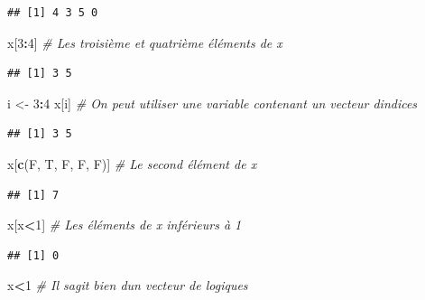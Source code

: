 \documentclass[
  11pt,
]{book}
\newenvironment{Shaded}{\begin{snugshade}}{\end{snugshade}}
\newcommand{\CommentTok}[1]{\textcolor[rgb]{0.56,0.35,0.01}{\textit{#1}}}
\newcommand{\DecValTok}[1]{\textcolor[rgb]{0.00,0.00,0.81}{#1}}
\newcommand{\KeywordTok}[1]{\textcolor[rgb]{0.13,0.29,0.53}{\textbf{#1}}}
\newcommand{\NormalTok}[1]{#1}
\newcommand{\OperatorTok}[1]{\textcolor[rgb]{0.81,0.36,0.00}{\textbf{#1}}}
\newcommand{\StringTok}[1]{\textcolor[rgb]{0.31,0.60,0.02}{#1}}
\numberwithin{equation}{section}
\numberwithin{countremarque}{section}
\begin{document}
\begin{lstlisting}
## [1] 4 3 5 0
\end{lstlisting}

\begin{Shaded}
\begin{Highlighting}[]
\NormalTok{x[}\DecValTok{3}\OperatorTok{:}\DecValTok{4}\NormalTok{]  }\CommentTok{\# Les troisième et quatrième éléments de x}
\end{Highlighting}
\end{Shaded}

\begin{lstlisting}
## [1] 3 5
\end{lstlisting}

\begin{Shaded}
\begin{Highlighting}[]
\NormalTok{i \textless{}{-}}\StringTok{ }\DecValTok{3}\OperatorTok{:}\DecValTok{4}
\NormalTok{x[i] }\CommentTok{\# On peut utiliser une variable contenant un vecteur d\textquotesingle{}indices}
\end{Highlighting}
\end{Shaded}

\begin{lstlisting}
## [1] 3 5
\end{lstlisting}

\begin{Shaded}
\begin{Highlighting}[]
\NormalTok{x[}\KeywordTok{c}\NormalTok{(F, T, F, F, F)] }\CommentTok{\# Le second élément de x}
\end{Highlighting}
\end{Shaded}

\begin{lstlisting}
## [1] 7
\end{lstlisting}

\begin{Shaded}
\begin{Highlighting}[]
\NormalTok{x[x}\OperatorTok{\textless{}}\DecValTok{1}\NormalTok{]  }\CommentTok{\# Les éléments de x inférieurs à 1}
\end{Highlighting}
\end{Shaded}

\begin{lstlisting}
## [1] 0
\end{lstlisting}

\begin{Shaded}
\begin{Highlighting}[]
\NormalTok{x}\OperatorTok{\textless{}}\DecValTok{1} \CommentTok{\# Il s\textquotesingle{}agit bien d\textquotesingle{}un vecteur de logiques}
\end{Highlighting}
\end{Shaded}
\end{document}
